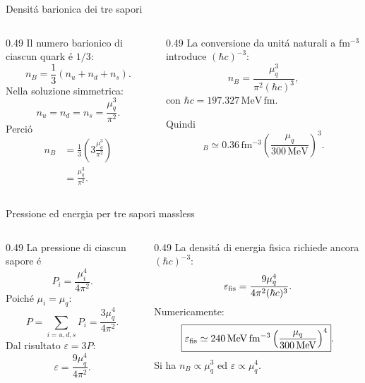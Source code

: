 \begin{frame}[t]{Densit\'a barionica dei tre sapori}
\small
\begin{columns}[T,onlytextwidth]
\begin{column}{0.49\textwidth}
Il numero barionico di ciascun quark \'e $1/3$:
\[
n_B=\frac13(n_u+n_d+n_s).
\]
Nella soluzione simmetrica:
\[
n_u=n_d=n_s=\frac{\mu_q^3}{\pi^2}.
\]
Perci\'o
\[
\begin{aligned}
n_B&=\frac13\left(3\frac{\mu_q^3}{\pi^2}\right)\\
&=\frac{\mu_q^3}{\pi^2}.
\end{aligned}
\]
\end{column}
\begin{column}{0.49\textwidth}
La conversione da unit\'a naturali a $\mathrm{fm^{-3}}$ introduce $(\hbar c)^{-3}$:
\[
n_B=\frac{\mu_q^3}{\pi^2(\hbar c)^3},
\]
con $\hbar c=197.327\,\mathrm{MeV\,fm}$.

Quindi
\[
\boxed{
_B\simeq0.36\,\mathrm{fm^{-3}}
\left(\frac{\mu_q}{300\,\mathrm{MeV}}\right)^3}.
\]
\end{column}
\end{columns}
\end{frame}

\begin{frame}[t]{Pressione ed energia per tre sapori massless}
\small
\begin{columns}[T,onlytextwidth]
\begin{column}{0.49\textwidth}
La pressione di ciascun sapore \'e
\[
P_i=\frac{\mu_i^4}{4\pi^2}.
\]
Poich\'e $\mu_i=\mu_q$:
\[
P=\sum_{i=u,d,s}P_i
=\frac{3\mu_q^4}{4\pi^2}.
\]
Dal risultato $\varepsilon=3P$:
\[
\boxed{\varepsilon=\frac{9\mu_q^4}{4\pi^2}}.
\]
\end{column}
\begin{column}{0.49\textwidth}
La densit\'a di energia fisica richiede ancora $(\hbar c)^{-3}$:
\[
\varepsilon_{\rm fis}=
\frac{9\mu_q^4}{4\pi^2(\hbar c)^3}.
\]
Numericamente:
\[
\boxed{
\varepsilon_{\rm fis}\simeq
240\,\mathrm{MeV\,fm^{-3}}
\left(\frac{\mu_q}{300\,\mathrm{MeV}}\right)^4}.
\]
Si ha $n_B\propto\mu_q^3$ ed $\varepsilon\propto\mu_q^4$.
\end{column}
\end{columns}
\end{frame}


